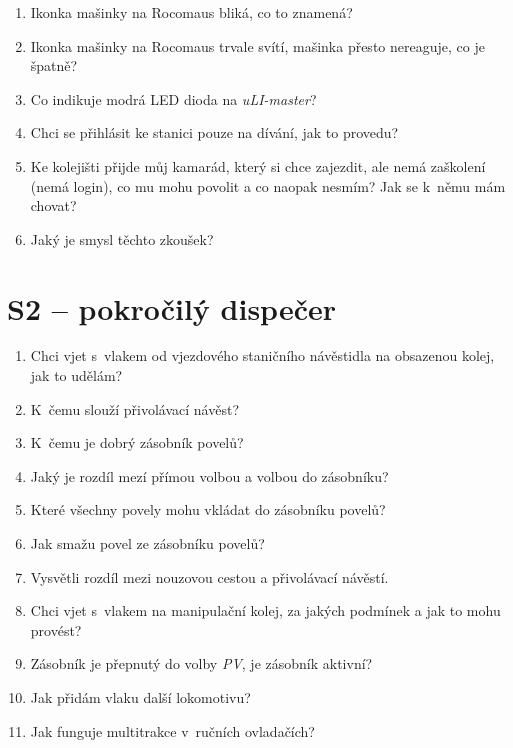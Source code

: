 \documentclass[12pt,a4paper]{article}
\begin{document}
\begin{enumerate}[leftmargin=*]
\item Ikonka mašinky na Rocomaus bliká, co to znamená?

\item Ikonka mašinky na Rocomaus trvale svítí, mašinka přesto nereaguje, co je
špatně?

\item Co indikuje modrá LED dioda na \textit{uLI-master}?

\item Chci se přihlásit ke stanici pouze na dívání, jak to provedu?

\item Ke kolejišti přijde můj kamarád, který si chce zajezdit, ale nemá
zaškolení (nemá login), co mu mohu povolit a co naopak nesmím? Jak se k~němu
mám chovat?

\item Jaký je smysl těchto zkoušek?

\end{enumerate}

\newpage
\section*{S2 – pokročilý dispečer}

\begin{enumerate}[leftmargin=*]
\item Chci vjet s~vlakem od vjezdového staničního návěstidla na obsazenou
kolej, jak to udělám?

\item K~čemu slouží přivolávací návěst?

\item K~čemu je dobrý zásobník povelů?

\item Jaký je rozdíl mezí přímou volbou a volbou do zásobníku?

\item Které všechny povely mohu vkládat do zásobníku povelů?

\item Jak smažu povel ze zásobníku povelů?

\item Vysvětli rozdíl mezi nouzovou cestou a přivolávací návěstí.

\item Chci vjet s~vlakem na manipulační kolej, za jakých podmínek a jak to mohu
provést?

\item Zásobník je přepnutý do volby \textit{PV}, je zásobník aktivní?

\item Jak přidám vlaku další lokomotivu?

\item Jak funguje multitrakce v~ručních ovladačích?

\end{enumerate}
\end{document}

